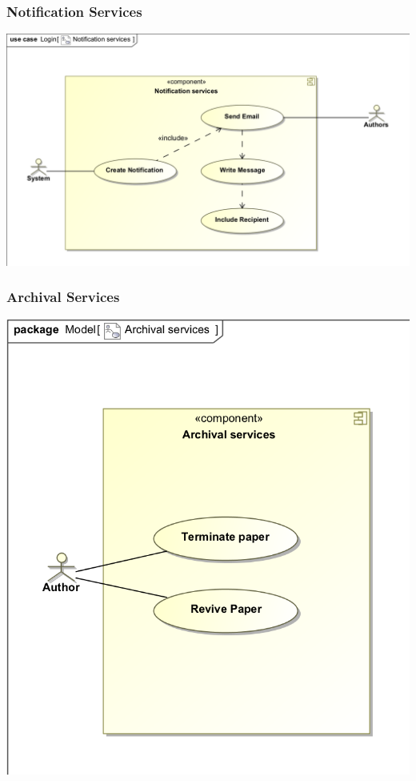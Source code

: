 \documentclass[11pt]{article}
\begin{document}
	\subsubsection{Notification Services}
	\begin{center}
		\includegraphics[width=\textwidth]{../Diagrams/UseCases/NotificationServices_UseCase.png}\\[0.5cm]
	\end{center}
	\newpage
	\subsubsection{Archival Services}
	\begin{center}
		\includegraphics[width=\textwidth]{../Diagrams/UseCases/ArchivalServices_UseCase.png}\\[0.5cm]
	\end{center}
	\newpage
	
\end{document}
